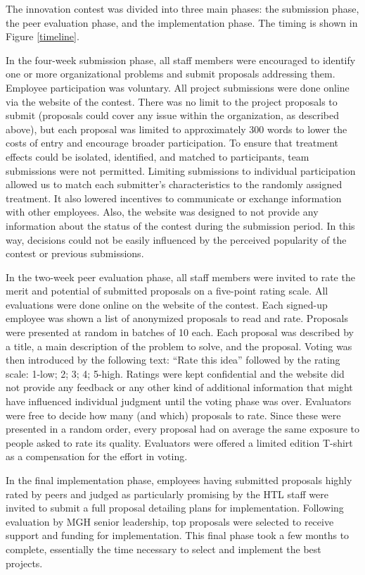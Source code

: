 \documentclass[11pt, titlepage]{article}
\begin{document}
The innovation contest was divided into three main phases: the
submission phase, the peer evaluation phase, and the implementation
phase. The timing is shown in Figure \ref{timeline}.

In the four-week submission phase, all staff members were encouraged to
identify one or more organizational problems and submit proposals
addressing them. Employee participation was voluntary. All project
submissions were done online via the website of the contest. There was
no limit to the project proposals to submit (proposals could cover any
issue within the organization, as described above), but each proposal
was limited to approximately 300 words to lower the costs of entry and
encourage broader participation. To ensure that treatment effects could
be isolated, identified, and matched to participants, team submissions
were not permitted. Limiting submissions to individual participation
allowed us to match each submitter's characteristics to the randomly
assigned treatment. It also lowered incentives to communicate or
exchange information with other employees. Also, the website was
designed to not provide any information about the status of the contest
during the submission period. In this way, decisions could not be easily
influenced by the perceived popularity of the contest or previous
submissions.

In the two-week peer evaluation phase, all staff members were invited to
rate the merit and potential of submitted proposals on a five-point
rating scale. All evaluations were done online on the website of the
contest. Each signed-up employee was shown a list of anonymized
proposals to read and rate. Proposals were presented at random in
batches of 10 each. Each proposal was described by a title, a main
description of the problem to solve, and the proposal. Voting was then
introduced by the following text: ``Rate this idea'' followed by the
rating scale: 1-low; 2; 3; 4; 5-high. Ratings were kept confidential and
the website did not provide any feedback or any other kind of additional
information that might have influenced individual judgment until the
voting phase was over. Evaluators were free to decide how many (and
which) proposals to rate. Since these were presented in a random order,
every proposal had on average the same exposure to people asked to rate
its quality. Evaluators were offered a limited edition T-shirt as a
compensation for the effort in voting.

In the final implementation phase, employees having submitted proposals
highly rated by peers and judged as particularly promising by the HTL
staff were invited to submit a full proposal detailing plans for
implementation. Following evaluation by MGH senior leadership, top
proposals were selected to receive support and funding for
implementation. This final phase took a few months to complete,
essentially the time necessary to select and implement the best
projects.
\end{document}
